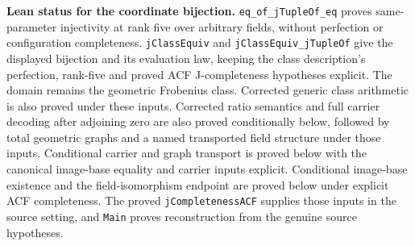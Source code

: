 \documentclass[11pt,oneside]{article}
\theoremstyle{definition}
\theoremstyle{remark}
\newcommand{\lean}[1]{\nolinkurl{#1}}
\begin{document}
\noindent\textbf{Lean status for the coordinate bijection.}
\lean{eq_of_jTupleOf_eq} proves same-parameter injectivity at rank five over
arbitrary fields, without perfection or configuration completeness.
\lean{jClassEquiv} and \lean{jClassEquiv_jTupleOf} give the displayed bijection
and its evaluation law, keeping the class description's perfection, rank-five
and proved ACF J-completeness hypotheses explicit. The domain remains
the geometric Frobenius class. Corrected generic class arithmetic is also proved under
these inputs. Corrected ratio semantics and full carrier decoding after adjoining
zero are also proved conditionally below, followed by total geometric graphs and a named
transported field structure under those inputs. Conditional carrier and graph transport
is proved below with the canonical image-base equality and carrier inputs explicit.
Conditional image-base existence and the field-isomorphism endpoint are proved below under
explicit ACF completeness. The proved \lean{jCompletenessACF} supplies those inputs in
the source setting, and \lean{Main} proves reconstruction from the genuine source hypotheses.
\end{document}
